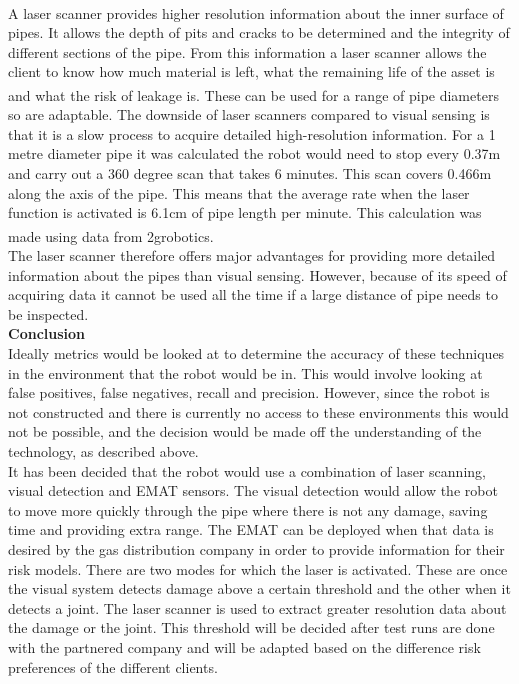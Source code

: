 \documentclass[11pt]{article}		%
\newcommand{\supercite}[1]{\textsuperscript{\cite{#1}}}		%
\begin{document}
	        \\
	        A laser scanner provides higher resolution information about the inner surface of pipes. %
	        It allows the depth of pits and cracks to be determined and the integrity of different sections of the pipe. 
	        From this information a laser scanner allows the client to know how much material is left, what the remaining life of the asset is and what the risk of leakage is.\supercite{2g_robotics}
	        These can be used for a range of pipe diameters so are  adaptable. The downside of laser scanners compared to visual sensing is that it is a slow process to acquire detailed high-resolution information. 
	        For a 1 metre diameter pipe it was calculated the robot would need to stop every 0.37m and carry out a 360 degree scan that takes 6 minutes. 
	        This scan covers 0.466m along the axis of the pipe. 
	        This means that the average rate when the laser function is activated is 6.1cm of pipe length per minute. 
	        This calculation was made using data from 2grobotics.\supercite{2g_robotics}
	        \\
	        The laser scanner therefore offers major advantages for providing more detailed information about the pipes than visual sensing. 
	        However, because of its speed of acquiring data it cannot be used all the time if a large distance of pipe needs to be inspected.
	        \\
	        \textbf{Conclusion}
	        \\
	        Ideally metrics would be looked at to determine the accuracy of these techniques in the environment that the robot would be in. 
	        This would involve looking at false positives, false negatives, recall and precision.
	        However, since the robot is not constructed and there is currently no access to these environments this would not be possible, and the decision would be made off the understanding of the technology, as described above.
	        \\
	        It has been decided that the robot would use a combination of laser scanning, visual detection and EMAT sensors.
	        The visual detection would allow the robot to move more quickly through the pipe where there is not any damage, saving time and providing extra range. 
	        The EMAT can be deployed when that data is desired by the gas distribution company in order to provide information for their risk models. 
	        There are  two modes for which the laser is activated. These are once the visual system detects damage  above a certain threshold and the other when it detects a joint. The laser scanner is used to extract greater resolution data about the damage or the joint. 
	        This threshold will be decided after test runs are done with the partnered company and will be adapted based on the difference risk preferences of the different clients.
	    	\\
\end{document}
